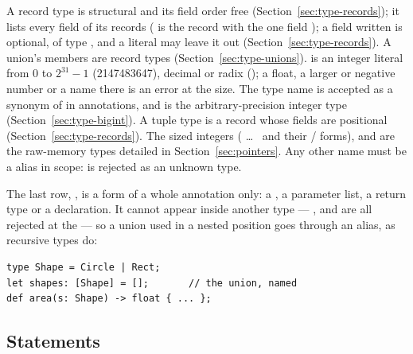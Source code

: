 \noindent A record type is structural and its field order free
(Section~\ref{sec:type-records}); it lists every field of its records
( is the record with the one field ); a field
written  is optional, of type , and a literal may
leave it out (Section~\ref{sec:type-records}). A union's
members are record types (Section~\ref{sec:type-unions}).  is an integer literal from 0 to $2^{31}-1$ (2147483647),
decimal or radix (\ic{[0; 0x10]}); a float, a larger or negative number
or a name there is an error at the size. The type name
 is accepted as a synonym of  in annotations, and
 is the arbitrary-precision integer type
(Section~\ref{sec:type-bigint}). A tuple type  is a
record whose fields are positional (Section~\ref{sec:type-records}). The
sized integers ( \ldots\  and their /
forms),  and  are the
raw-memory types detailed in Section~\ref{sec:pointers}. Any other
name must be a  alias in scope:  is
rejected as an unknown type.

The last row, , is a form of a whole annotation only: a
, a parameter list, a return type or a  declaration.
It cannot appear inside another type --- ,
 and  are all
rejected at the \ic{|} --- so a union used in a nested position goes
through an alias, as recursive types do:

\begin{lstlisting}
type Shape = Circle | Rect;
let shapes: [Shape] = [];       // the union, named
def area(s: Shape) -> float { ... };
\end{lstlisting}

\subsection{Statements}


